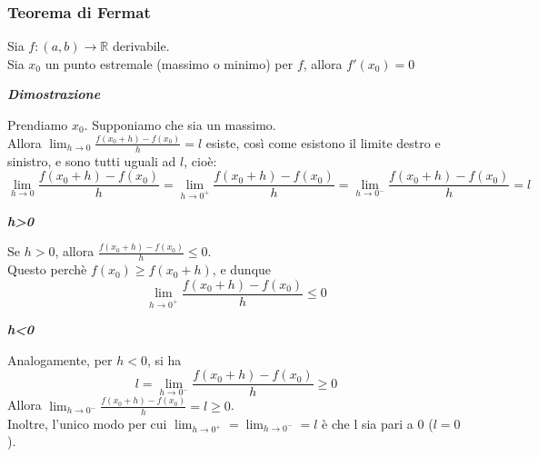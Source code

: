 \documentclass{article}
\theoremstyle{definition}
\begin{document}
\subsubsection{Teorema di Fermat}
Sia $f:(a,b) \to \mathbb{R}$ derivabile.
\\
Sia $x_0$ un punto estremale (massimo o minimo) per $f$, allora $f'(x_0)=0$
\begin{center}
    \textbf{\textit{Dimostrazione}}
\end{center}
Prendiamo $x_0$. Supponiamo che sia un massimo.
\\
Allora $\lim_{h \to 0}\frac{f(x_0+h)-f(x_0)}{h}=l$ esiste, così come esistono il limite destro e sinistro, e sono tutti uguali ad $l$, cioè:
\begin{equation*}
    \lim_{h \to 0}\frac{f(x_0+h)-f(x_0)}{h}= \lim_{h \to 0^+}\frac{f(x_0+h)-f(x_0)}{h}= \lim_{h \to 0^-}\frac{f(x_0+h)-f(x_0)}{h}=l
\end{equation*}
\begin{center}
    \textbf{\textit{h>0}}
\end{center}
Se $h>0$, allora $\frac{f(x_0+h)-f(x_0)}{h}\leqslant 0$.
\\
Questo perchè $f(x_0) \geqslant f(x_0+h)$, e dunque
\begin{equation*}
    \lim_{h \to 0^+}\frac{f(x_0+h)-f(x_0)}{h} \leqslant 0
\end{equation*}
\begin{center}
    \textbf{\textit{h<0}}
\end{center}
Analogamente, per $h<0$, si ha
\begin{equation*}
    l=\lim_{h \to 0^-}\frac{f(x_0+h)-f(x_0)}{h} \geqslant 0
\end{equation*}
    Allora $\lim_{h \to 0^-}\frac{f(x_0+h)-f(x_0)}{h}=l \geqslant 0$.
    \\
    Inoltre, l'unico modo per cui $\lim_{h \to 0^+}=\lim_{h \to 0^-}=l$ è che l sia pari a 0 ($l=0$).
\end{document}
